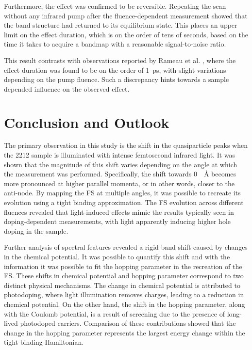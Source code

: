 Furthermore, the effect was confirmed to be reversible.
Repeating the scan without any infrared pump after the fluence-dependent measurement showed that the band structure had returned to its equilibrium state.
This places an upper limit on the effect duration, which is on the order of tens of seconds, based on the time it takes to acquire a bandmap with a reasonable signal-to-noise ratio.

This result contrasts with observations reported by Rameau et al. \cite{rameau_photoinduced_2014}, where the effect duration was found to be on the order of \qty{1}{\pico\second}, with slight variations depending on the pump fluence.
Such a discrepancy hints towards a sample depended influence on the observed effect.

\section{Conclusion and Outlook}

The primary observation in this study is the shift in the quasiparticle peaks when the 2212 sample is illuminated with intense femtosecond infrared light.
It was shown that the magnitude of this shift varies depending on the angle at which the measurement was performed.
Specifically, the shift towards \qty{0}{\per\angstrom} becomes more pronounced at higher parallel momenta, or in other words, closer to the anti-node.
By mapping the FS at multiple angles, it was possible to recreate its evolution using a tight binding approximation.
The FS evolution across different fluences revealed that light-induced effects mimic the results typically seen in doping-dependent measurements, with light apparently inducing higher hole doping in the sample.

Further analysis of spectral features revealed a rigid band shift caused by changes in the chemical potential.
It was possible to quantify this shift and with the information it was possible to fit the hopping parameter in the recreation of the FS.
These shifts in chemical potential and hopping parameter correspond to two distinct physical mechanisms.
The change in chemical potential is attributed to photodoping, where light illumination removes charges, leading to a reduction in chemical potential.
On the other hand, the shift in the hopping parameter, along with the Coulomb potential, is a result of screening due to the presence of long-lived photodoped carriers.
Comparison of these contributions showed that the change in the hopping parameter represents the largest energy change within the tight binding Hamiltonian.

